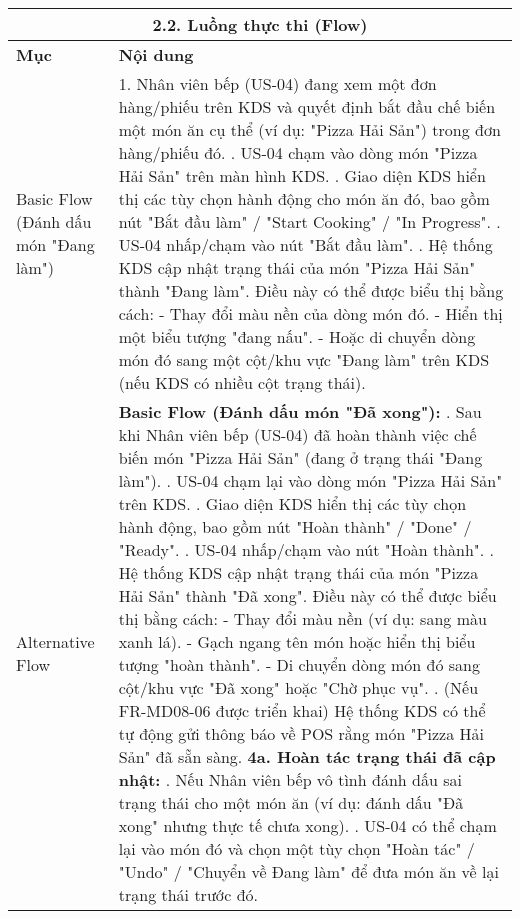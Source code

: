 \begin{longtable}{|m{4cm}|p{11cm}|}
\hline
\multicolumn{2}{|c|}{\textbf{2.2. Luồng thực thi (Flow)}} \\
\hline
\textbf{Mục} & \textbf{Nội dung} \\
\hline
Basic Flow (Đánh dấu món "Đang làm") & 1. Nhân viên bếp (US-04) đang xem một đơn hàng/phiếu trên KDS và quyết định bắt đầu chế biến một món ăn cụ thể (ví dụ: "Pizza Hải Sản") trong đơn hàng/phiếu đó. \newline 2. US-04 chạm vào dòng món "Pizza Hải Sản" trên màn hình KDS. \newline 3. Giao diện KDS hiển thị các tùy chọn hành động cho món ăn đó, bao gồm nút "Bắt đầu làm" / "Start Cooking" / "In Progress". \newline 4. US-04 nhấp/chạm vào nút "Bắt đầu làm". \newline 5. Hệ thống KDS cập nhật trạng thái của món "Pizza Hải Sản" thành "Đang làm". Điều này có thể được biểu thị bằng cách: \newline    - Thay đổi màu nền của dòng món đó. \newline    - Hiển thị một biểu tượng "đang nấu". \newline    - Hoặc di chuyển dòng món đó sang một cột/khu vực "Đang làm" trên KDS (nếu KDS có nhiều cột trạng thái). \\
\hline
Alternative Flow & \textbf{Basic Flow (Đánh dấu món "Đã xong"):} \newline    1. Sau khi Nhân viên bếp (US-04) đã hoàn thành việc chế biến món "Pizza Hải Sản" (đang ở trạng thái "Đang làm"). \newline    2. US-04 chạm lại vào dòng món "Pizza Hải Sản" trên KDS. \newline    3. Giao diện KDS hiển thị các tùy chọn hành động, bao gồm nút "Hoàn thành" / "Done" / "Ready". \newline    4. US-04 nhấp/chạm vào nút "Hoàn thành". \newline    5. Hệ thống KDS cập nhật trạng thái của món "Pizza Hải Sản" thành "Đã xong". Điều này có thể được biểu thị bằng cách: \newline       - Thay đổi màu nền (ví dụ: sang màu xanh lá). \newline       - Gạch ngang tên món hoặc hiển thị biểu tượng "hoàn thành". \newline       - Di chuyển dòng món đó sang cột/khu vực "Đã xong" hoặc "Chờ phục vụ". \newline    6. (Nếu FR-MD08-06 được triển khai) Hệ thống KDS có thể tự động gửi thông báo về POS rằng món "Pizza Hải Sản" đã sẵn sàng. \newline \textbf{4a. Hoàn tác trạng thái đã cập nhật:} \newline    1. Nếu Nhân viên bếp vô tình đánh dấu sai trạng thái cho một món ăn (ví dụ: đánh dấu "Đã xong" nhưng thực tế chưa xong). \newline    2. US-04 có thể chạm lại vào món đó và chọn một tùy chọn "Hoàn tác" / "Undo" / "Chuyển về Đang làm" để đưa món ăn về lại trạng thái trước đó. \\

\end{longtable}
